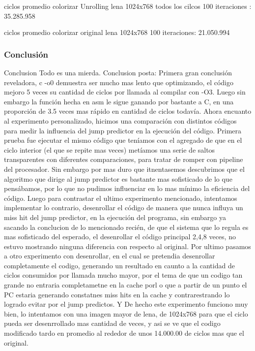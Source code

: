 	ciclos promedio colorizar Unrolling lena 1024x768
	 todos los cilcos 100 iteraciones : 35.285.958
	
	ciclos promedio colorizar original lena 1024x768 100 iteraciones:	21.050.994
	
	
	
\subsubsection{Conclusión}
Conclusion Todo es una mierda.
Conclusion posta:
 Primera gran conclusión reveladora, c -o0 demuestra ser mucho mas lento que optimizando, el código mejoro 5 veces su cantidad de ciclos por llamada al compilar con -O3.
  Luego sin embargo la función hecha en  asm le sigue ganando por bastante a C, en una proporción de 3.5 veces mas rápido en cantidad de ciclos todavía.
  Ahora encuanto al experimento personalizado, hicimos una comparación con distintos códigos para medir la influencia del jump predictor en la ejecución del código. Primera prueba fue ejecutar el mismo código que teníamos con el agregado de que en el ciclo interior (el que se repite mas veces) metíamos una serie de saltos transparentes con diferentes comparaciones, para tratar de romper con pipeline del procesador. Sin embargo por mas duro que itnentasemos descubrimos que el algoritmo que dirige al jump predictor es bastante mas sofisticado de lo que pensábamos, por lo que no pudimos influenciar en lo mas mínimo la eficiencia del código. 
   Luego para contrastar el ultimo experimento mencionado, intentamos implementar lo contrario, desenrollar el código de manera que nunca influya un miss hit del jump predictor, en la ejecución del programa, sin embargo ya sacando la conclucion de lo mencionado recién, de que el sistema que lo regula es mas sofisticado del esperado, el desenrollar el código principal 2,4,8 veces, no estuvo mostrando ninguna diferencia con respecto al original. 
   Por ultimo pasamos a otro experimento con desenrollar, en el cual se pretendia desenrollar completamente el codigo, generando un resultado en caunto a la cantidad de ciclos consumidos por llamada mucho mayor, por el tema de que un codigo tan grande no entraria completametne en la cache porl o que a partir de un punto el PC estaria generando constatnes miss hits en la cache y contrarestrando lo logrado evitar por el jump predictos. Y De hecho este experimento funciono muy bien, lo intentamos con una imagen mayor de lena, de 1024x768 para que el ciclo pueda ser desenrrollado mas cantidad de veces, y asi se ve que el codigo modificado tardo en promedio al rededor de unos 14.000.00 de ciclos mas que el original.
